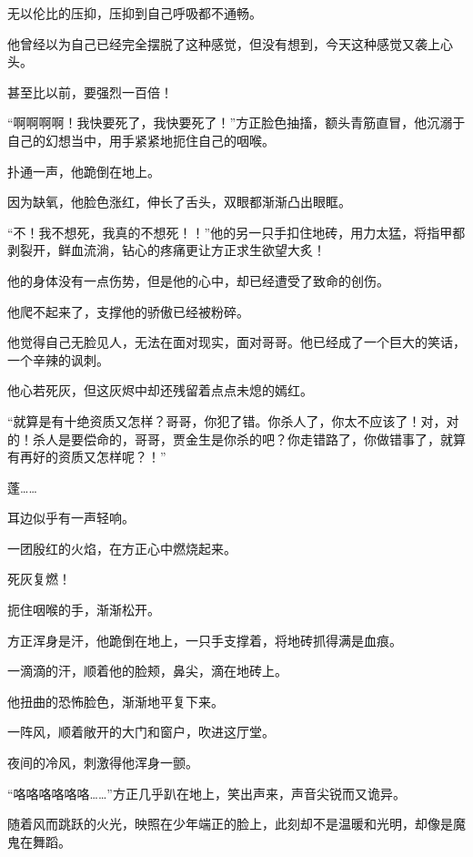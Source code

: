 \begin{this_body}
无以伦比的压抑，压抑到自己呼吸都不通畅。

他曾经以为自己已经完全摆脱了这种感觉，但没有想到，今天这种感觉又袭上心头。

甚至比以前，要强烈一百倍！

“啊啊啊啊！我快要死了，我快要死了！”方正脸色抽搐，额头青筋直冒，他沉溺于自己的幻想当中，用手紧紧地扼住自己的咽喉。

扑通一声，他跪倒在地上。

因为缺氧，他脸色涨红，伸长了舌头，双眼都渐渐凸出眼眶。

“不！我不想死，我真的不想死！！”他的另一只手扣住地砖，用力太猛，将指甲都剥裂开，鲜血流淌，钻心的疼痛更让方正求生欲望大炙！

他的身体没有一点伤势，但是他的心中，却已经遭受了致命的创伤。

他爬不起来了，支撑他的骄傲已经被粉碎。

他觉得自己无脸见人，无法在面对现实，面对哥哥。他已经成了一个巨大的笑话，一个辛辣的讽刺。

他心若死灰，但这灰烬中却还残留着点点未熄的嫣红。

“就算是有十绝资质又怎样？哥哥，你犯了错。你杀人了，你太不应该了！对，对的！杀人是要偿命的，哥哥，贾金生是你杀的吧？你走错路了，你做错事了，就算有再好的资质又怎样呢？！”

蓬……

耳边似乎有一声轻响。

一团殷红的火焰，在方正心中燃烧起来。

死灰复燃！

扼住咽喉的手，渐渐松开。

方正浑身是汗，他跪倒在地上，一只手支撑着，将地砖抓得满是血痕。

一滴滴的汗，顺着他的脸颊，鼻尖，滴在地砖上。

他扭曲的恐怖脸色，渐渐地平复下来。

一阵风，顺着敞开的大门和窗户，吹进这厅堂。

夜间的冷风，刺激得他浑身一颤。

“咯咯咯咯咯咯……”方正几乎趴在地上，笑出声来，声音尖锐而又诡异。

随着风而跳跃的火光，映照在少年端正的脸上，此刻却不是温暖和光明，却像是魔鬼在舞蹈。

\end{this_body}

